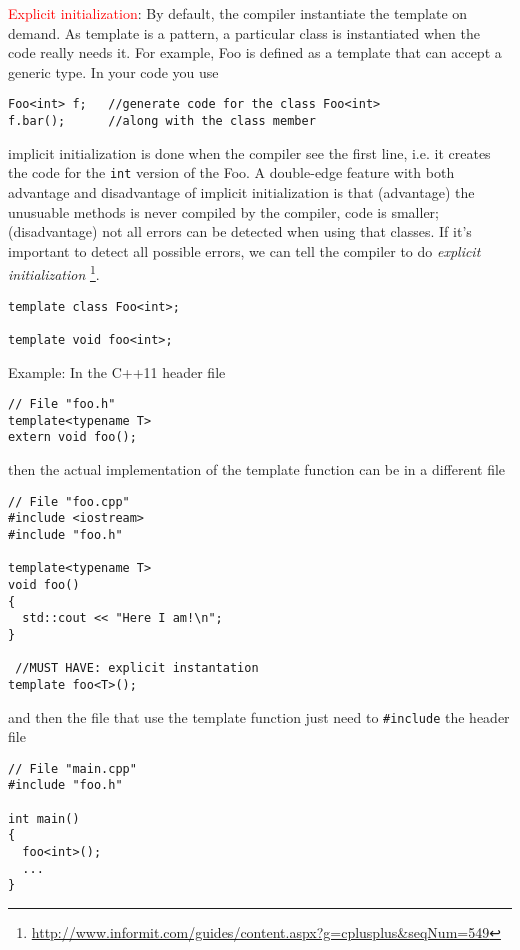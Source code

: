 \textcolor{red}{Explicit initialization}: By default, the compiler instantiate
the template on demand. As template is a pattern, a particular 
class is instantiated when the code really needs it. For example, Foo is defined
as a template that can accept a generic type. In your code you use
\begin{lstlisting}
Foo<int> f;   //generate code for the class Foo<int>
f.bar();      //along with the class member
\end{lstlisting}
implicit initialization is done when the compiler see the first line, i.e. it
creates the code for the \verb!int! version of the Foo. A
double-edge feature with both advantage and disadvantage of implicit
initialization is that (advantage) the unusuable methods is never compiled by
the compiler, code is smaller; (disadvantage) not all errors can be detected
when using that classes. If it's important to detect all possible errors, we can
tell the compiler to do {\it explicit initialization}
\footnote{\url{http://www.informit.com/guides/content.aspx?g=cplusplus&seqNum=549}}.
\begin{lstlisting}
template class Foo<int>;  

template void foo<int>;
\end{lstlisting}
Example: 
In the C++11 header file
\begin{lstlisting}
// File "foo.h"
template<typename T>
extern void foo();
\end{lstlisting}
then the actual implementation of the template function can be in a different
file
\begin{lstlisting}
// File "foo.cpp"
#include <iostream>
#include "foo.h"

template<typename T>
void foo()
{
  std::cout << "Here I am!\n";
}
 
 //MUST HAVE: explicit instantation
template foo<T>();
\end{lstlisting}
and then the file that use the template function just need to \verb!#include!
the header file
\begin{lstlisting}
// File "main.cpp"
#include "foo.h"

int main()
{
  foo<int>();
  ...
}
\end{lstlisting}

